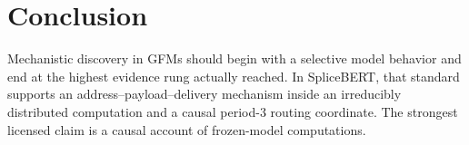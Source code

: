 \documentclass{article}
\begin{document}
\section{Conclusion}

Mechanistic discovery in GFMs should begin with a selective model behavior and end at the highest evidence rung actually reached.  In SpliceBERT, that standard supports an address--payload--delivery mechanism inside an irreducibly distributed computation and a causal period-3 routing coordinate. The strongest licensed claim is a causal account of frozen-model computations.





\newpage

\end{document}
